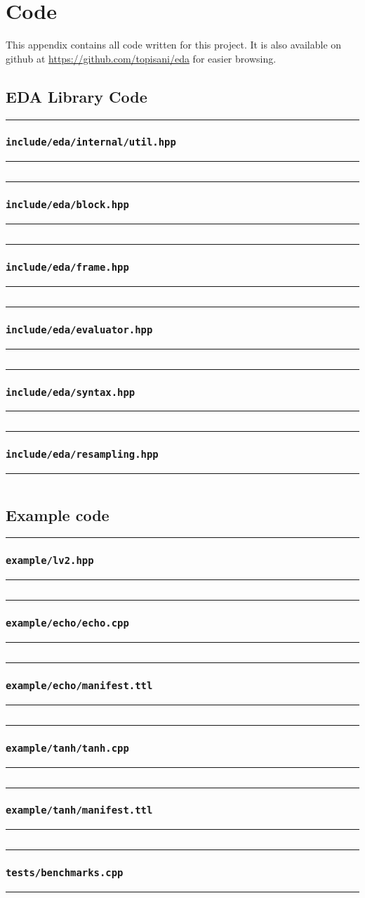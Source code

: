 \chapter{Code}
\label{appendix}

This appendix contains all code written for this project. It is also available on github at
\url{https://github.com/topisani/eda} for easier browsing.

\section{EDA Library Code}

\newcommand{\inputcode}[2]{
  \hrule %
  \subsection*{\texttt{#2}}
  \label{codefile:#2}
  \hrule
  \inputminted[linenos, mathescape]{#1}{eda/#2}
}

\inputcode{cpp}{include/eda/internal/util.hpp}
\inputcode{cpp}{include/eda/block.hpp}
\inputcode{cpp}{include/eda/frame.hpp}
\inputcode{cpp}{include/eda/evaluator.hpp}
\inputcode{cpp}{include/eda/syntax.hpp}
\inputcode{cpp}{include/eda/resampling.hpp}

\section{Example code}
\inputcode{cpp}{example/lv2.hpp}
\inputcode{cpp}{example/echo/echo.cpp}
\inputcode{turtle}{example/echo/manifest.ttl}
\inputcode{cpp}{example/tanh/tanh.cpp}
\inputcode{turtle}{example/tanh/manifest.ttl}
\inputcode{cpp}{tests/benchmarks.cpp}
